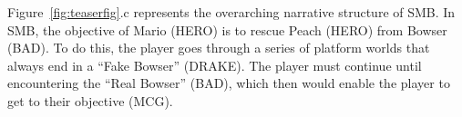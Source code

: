 Figure~\ref{fig:teaserfig}.c represents the overarching narrative structure of SMB. In SMB, the objective of Mario (HERO) is to rescue Peach (HERO) from Bowser (BAD). To do this, the player goes through a series of platform worlds that always end in a ``Fake Bowser'' (DRAKE). The player must continue until encountering the ``Real Bowser'' (BAD), which then would enable the player to get to their objective (MCG). %
